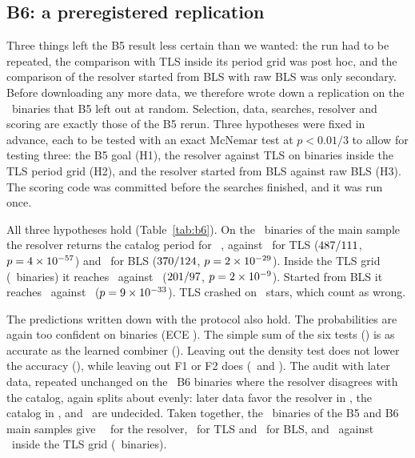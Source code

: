 \documentclass[twocolumn,linenumbers]{aastex701}
\begin{document}


\subsection{B6: a preregistered replication} \label{sec:b6}

Three things left the B5 result less certain than we wanted: the run had to be repeated, the comparison with TLS inside its period grid was post hoc, and the comparison of the resolver started from BLS with raw BLS was only secondary. Before downloading any more data, we therefore wrote down a replication on the \bSixIncluded\ binaries that B5 left out at random. Selection, data, searches, resolver and scoring are exactly those of the B5 rerun. Three hypotheses were fixed in advance, each to be tested with an exact McNemar test at $p<0.01/3$ to allow for testing three: the B5 goal (H1), the resolver against TLS on binaries inside the TLS period grid (H2), and the resolver started from BLS against raw BLS (H3). The scoring code was committed before the searches finished, and it was run once.

All three hypotheses hold (Table~\ref{tab:b6}). On the \bSixN\ binaries of the main sample the resolver returns the catalog period for \bSixAcc\ \bSixAccCI, against \bSixTls\ for TLS ($487/111$, $p=4\times10^{-57}$) and \bSixBls\ for BLS ($370/124$, $p=2\times10^{-29}$). Inside the TLS grid (\bSixHtwoN\ binaries) it reaches \bSixHtwoAcc\ against \bSixHtwoTls\ ($201/97$, $p=2\times10^{-9}$). Started from BLS it reaches \bSixAccBlsSeed\ against \bSixBls\ ($p=9\times10^{-33}$). TLS crashed on \bSixTlsErr\ stars, which count as wrong.

The predictions written down with the protocol also hold. The probabilities are again too confident on binaries (ECE \bSixEce). The simple sum of the six tests (\bSixSum) is as accurate as the learned combiner (\bSixLearned). Leaving out the density test does not lower the accuracy (\bSixNoFfour), while leaving out F1 or F2 does (\bSixNoFone\ and \bSixNoFtwo). The audit with later data, repeated unchanged on the \bSixAuditN\ B6 binaries where the resolver disagrees with the catalog, again splits about evenly: later data favor the resolver in \bSixAuditRes, the catalog in \bSixAuditCat, and \bSixAuditInc\ are undecided. Taken together, the \poolN\ binaries of the B5 and B6 main samples give \poolAcc\ \poolAccCI\ for the resolver, \poolTls\ for TLS and \poolBls\ for BLS, and \poolGridAcc\ against \poolGridTls\ inside the TLS grid (\poolGridN\ binaries).
\end{document}

